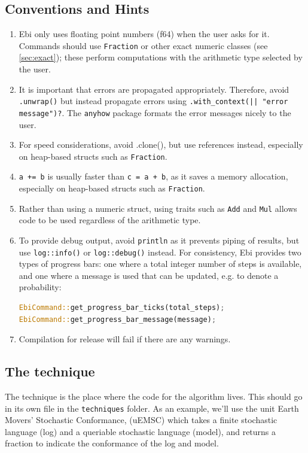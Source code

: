\documentclass{book}
\begin{document}
		\subsection{Conventions and Hints}
			\begin{enumerate}
				\item Ebi only uses floating point numbers (f64) when the user asks for it.
				Commands should use \verb=Fraction= or other exact numeric classes (see \cref{sec:exact}); these perform computations with the arithmetic type selected by the user.
				\item It is important that errors are propagated appropriately.
				Therefore, avoid \verb=.unwrap()= but instead propagate errors using \verb=.with_context(|| "error message")?=.
				The \verb=anyhow= package formats the error messages nicely to the user.
				\item For speed considerations, avoid .clone(), but use references instead, especially on heap-based structs such as \verb=Fraction=.
				\item \verb|a += b| is usually faster than \verb|c = a + b|, as it saves a memory allocation, especially on heap-based structs such as \verb=Fraction=.
				\item Rather than using a numeric struct, using traits such as \verb=Add= and \verb=Mul= allows code to be used regardless of the arithmetic type.
				\item To provide debug output, avoid \verb=println= as it prevents piping of results, but use \verb=log::info()= or \verb=log::debug()= instead.
				For consistency, Ebi provides two types of progress bars: one where a total integer number of steps is available, and one where a message is used that can be updated, e.g. to denote a probability:
\begin{lstlisting}[language=Rust, style=boxed]
EbiCommand::get_progress_bar_ticks(total_steps);
EbiCommand::get_progress_bar_message(message);
\end{lstlisting}
                \item Compilation for release will fail if there are any warnings.
			\end{enumerate}
            
		\subsection{The technique}
			The technique is the place where the code for the algorithm lives.
			This should go in its own file in the \verb=techniques= folder.
			As an example, we'll use the unit Earth Movers' Stochastic Conformance, (uEMSC) which takes a finite stochastic language (log) and a queriable stochastic language (model), and returns a fraction to indicate the conformance of the log and model.
			
\end{document}
